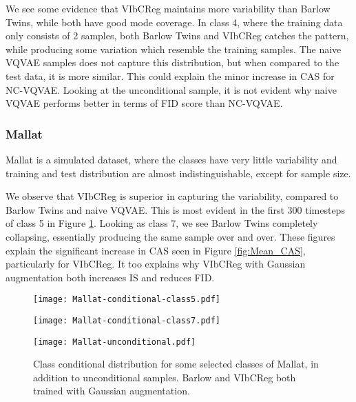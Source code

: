 \documentclass[../../thesis.tex]{subfiles}
\begin{document}
We see some evidence that VIbCReg maintains more variability than Barlow Twins, while both have good mode coverage. In class 4, where the training data only consists of 2 samples, both Barlow Twins and VIbCReg catches the pattern, while producing some variation which resemble the training samples. The naive VQVAE samples does not capture this distribution, but when compared to the test data, it is more similar. This could explain the minor increase in CAS for NC-VQVAE. Looking at the unconditional sample, it is not evident why naive VQVAE performs better in terms of FID score than NC-VQVAE.


\subsubsection{Mallat}
Mallat is a simulated dataset, where the classes have very little variability and training and test distribution are almost indistinguishable, except for sample size. \newline

We observe that VIbCReg is superior in capturing the variability, compared to Barlow Twins and naive VQVAE. This is most evident in the first 300 timesteps of class 5 in Figure \ref{fig:Gaussian_Mallat}. Looking as class 7, we see Barlow Twins completely collapsing, essentially producing the same sample over and over. These figures explain the significant increase in CAS seen in Figure \ref{fig:Mean_CAS}, particularly for VIbCReg. It too explains why VIbCReg with Gaussian augmentation both increases IS and reduces FID. \newline

\begin{figure}[h]
    \centering
    \begin{minipage}[b]{0.32\textwidth}
        \centering
        \texttt{[image: Mallat-conditional-class5.pdf]}
    \end{minipage}
    \begin{minipage}[b]{0.32\textwidth}
        \centering
        \texttt{[image: Mallat-conditional-class7.pdf]}
    \end{minipage}
    \begin{minipage}[b]{0.32\textwidth}
        \centering
        \texttt{[image: Mallat-unconditional.pdf]}
    \end{minipage}
    \caption{Class conditional distribution for some selected classes of Mallat, in addition to unconditional samples. Barlow and VIbCReg both trained with Gaussian augmentation.}
    \label{fig:Gaussian_Mallat}
\end{figure}
\end{document}
